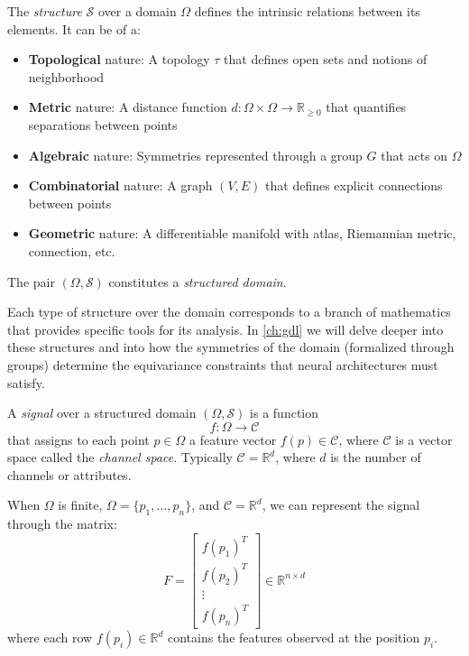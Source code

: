 \begin{definition}\label{def:estructura_dominio}
The \textit{structure} $\mathcal{S}$ over a domain $\Omega$ defines the intrinsic relations between its elements. It can be of a:
\begin{itemize}
	\item \textbf{Topological} nature: A topology $\tau$ that defines open sets and notions of neighborhood
	\item \textbf{Metric} nature: A distance function $d: \Omega \times \Omega \to \mathbb{R}_{\geq 0}$ that quantifies separations between points
	\item \textbf{Algebraic} nature: Symmetries represented through a group $G$ that acts on $\Omega$
	\item \textbf{Combinatorial} nature: A graph $(V, E)$ that defines explicit connections between points
	\item \textbf{Geometric} nature: A differentiable manifold with atlas, Riemannian metric, connection, etc.
\end{itemize}

The pair $(\Omega, \mathcal{S})$ constitutes a \textit{structured domain}.
\end{definition}

Each type of structure over the domain corresponds to a branch of mathematics that provides specific tools for its analysis. In \autoref{ch:gdl} we will delve deeper into these structures and into how the symmetries of the domain (formalized through groups) determine the equivariance constraints that neural architectures must satisfy.

\begin{definition}[Signal]\label{def:senal}
A \textit{signal} over a structured domain $(\Omega, \mathcal{S})$ is a function
\[
f: \Omega \to \mathcal{C}
\]
that assigns to each point $p \in \Omega$ a feature vector $f(p) \in \mathcal{C}$, where $\mathcal{C}$ is a vector space called the \textit{channel space}. Typically $\mathcal{C} = \mathbb{R}^d$, where $d$ is the number of channels or attributes.

When $\Omega$ is finite, $\Omega = \{p_1, \ldots, p_n\}$, and $\mathcal{C} = \mathbb{R}^d$, we can represent the signal through the matrix:
\[
F = \begin{bmatrix}
	f(p_1)^T \\
	f(p_2)^T \\
	\vdots \\
	f(p_n)^T
\end{bmatrix} \in \mathbb{R}^{n \times d}
\]
where each row $f(p_i) \in \mathbb{R}^d$ contains the features observed at the position $p_i$.
\end{definition}

